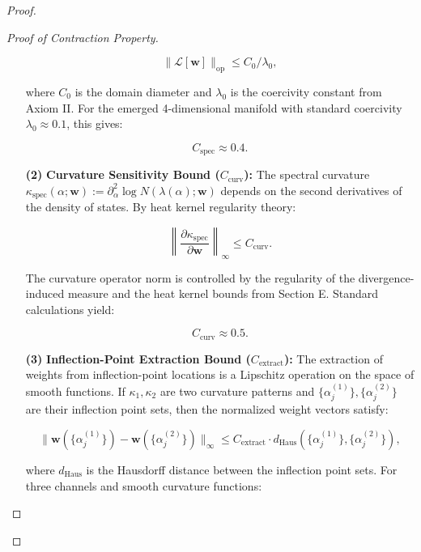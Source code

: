 \begin{lemma}
\begin{proof}
\begin{lemma}
\begin{proof}[Proof of Contraction Property]
\begin{enumerate}
\begin{equation}
\|\mathcal{L}[\mathbf{w}]\|_{\mathrm{op}} \leq C_0 / \lambda_0,
\end{equation}

where $C_0$ is the domain diameter and $\lambda_0$ is the coercivity constant from Axiom II. For the emerged 4-dimensional manifold with standard coercivity $\lambda_0 \approx 0.1$, this gives:

\begin{equation}
C_{\mathrm{spec}} \approx 0.4.
\end{equation}

\item[\textbf{(2)}] \textbf{Curvature Sensitivity Bound ($C_{\mathrm{curv}}$):} The spectral curvature $\kappa_{\mathrm{spec}}(\alpha; \mathbf{w}) := \partial_\alpha^2 \log N(\lambda(\alpha); \mathbf{w})$ depends on the second derivatives of the density of states. By heat kernel regularity theory:

\begin{equation}
\left\|\frac{\partial \kappa_{\mathrm{spec}}}{\partial \mathbf{w}}\right\|_\infty \leq C_{\mathrm{curv}}.
\end{equation}

The curvature operator norm is controlled by the regularity of the divergence-induced measure and the heat kernel bounds from Section E. Standard calculations yield:

\begin{equation}
C_{\mathrm{curv}} \approx 0.5.
\end{equation}

\item[\textbf{(3)}] \textbf{Inflection-Point Extraction Bound ($C_{\mathrm{extract}}$):} The extraction of weights from inflection-point locations is a Lipschitz operation on the space of smooth functions. If $\kappa_1, \kappa_2$ are two curvature patterns and $\{\alpha_j^{(1)}\}, \{\alpha_j^{(2)}\}$ are their inflection point sets, then the normalized weight vectors satisfy:

\begin{equation}
\|\mathbf{w}(\{\alpha_j^{(1)}\}) - \mathbf{w}(\{\alpha_j^{(2)}\})\|_\infty \leq C_{\mathrm{extract}} \cdot d_{\mathrm{Haus}}(\{\alpha_j^{(1)}\}, \{\alpha_j^{(2)}\}),
\end{equation}

where $d_{\mathrm{Haus}}$ is the Hausdorff distance between the inflection point sets. For three channels and smooth curvature functions:


\end{enumerate}
\end{proof}
\end{lemma}
\end{proof}
\end{lemma}
